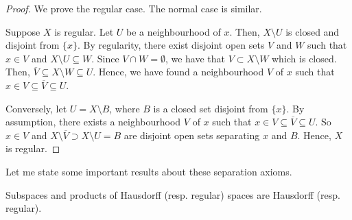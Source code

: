 \begin{proof}
    We prove the regular case. The normal case is similar.

    Suppose $X$ is regular. Let $U$ be a neighbourhood of $x$. Then, $X\setminus U$ is closed and disjoint from $\{x\}$. By regularity, there exist disjoint open sets $V$ and $W$ such that $x\in V$ and $X\setminus U\subseteq W$. Since $V\cap W=\emptyset$, we have that $V\subset X\setminus W$ which is closed. Then, $\overline{V}\subseteq X\setminus W\subseteq U$. Hence, we have found a neighbourhood $V$ of $x$ such that $x\in V\subseteq \overline{V}\subseteq U$.

    Conversely, let $U=X\setminus B$, where $B$ is a closed set disjoint from $\{x\}$. By assumption, there exists a neighbourhood $V$ of $x$ such that $x\in V\subseteq \overline{V}\subseteq U$. So $x\in V$ and $X\setminus\overline{V}\supset X\setminus U= B$ are disjoint open sets separating $x$ and $B$. Hence, $X$ is regular.
\end{proof}



Let me state some important results about these separation axioms.

\begin{theorem}
    Subspaces and products of Hausdorff (resp. regular) spaces are Hausdorff (resp. regular).
\end{theorem}

